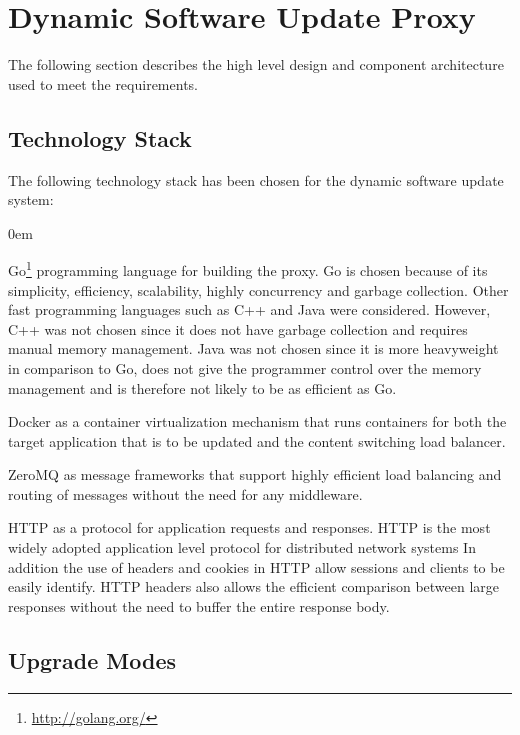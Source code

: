 \documentclass[a4paper,11pt,twoside]{report}
\begin{document}
\section{Dynamic Software Update Proxy} 

The following section describes the high level design and component architecture used to meet the requirements.

\subsection{Technology Stack} 
The following technology stack has been chosen for the dynamic software update system:

\begin{list}{-}{}
  \itemsep0em
  \item Go\footnote{\url{http://golang.org/}} programming language for building the proxy. Go is chosen because of its simplicity, efficiency, scalability, highly concurrency and garbage collection. Other fast programming languages such as C++ and Java were considered. However, C++ was not chosen since it does not have garbage collection and requires manual memory management. Java was not chosen since it is more heavyweight in comparison to Go, does not give the programmer control over the memory management and is therefore not likely to be as efficient as Go.
    
  \item Docker as a container virtualization mechanism that runs containers for both the target application that is to be updated and the content switching load balancer.
  
  \item ZeroMQ as message frameworks that support highly efficient load balancing and routing of messages without the need for any middleware.
  
  \item HTTP as a protocol for application requests and responses.  HTTP is the most widely adopted application level protocol for distributed network systems In addition the use of headers and cookies in HTTP allow sessions and clients to be easily identify.  HTTP headers also allows the efficient comparison between large responses without the need to buffer the entire response body.
\end{list}
  
\subsection{Upgrade Modes}\label{modes}
  
\end{document}
